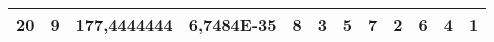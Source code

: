 \documentclass[conference]{IEEEtran}
\begin{document}
\begin{table*}[]
\begin{tabular}{|llll|llllllll|}
\multicolumn{1}{|l|}{20}                                                             & \multicolumn{1}{l|}{9}                                                                 & \multicolumn{1}{l|}{177,4444444}                                                           & 6,7484E-35                              & \multicolumn{1}{l|}{8}                                                           & \multicolumn{1}{l|}{3}                                                           & \multicolumn{1}{l|}{5}                                                           & \multicolumn{1}{l|}{7}                                                           & \multicolumn{1}{l|}{2}                                                           & \multicolumn{1}{l|}{6}                                                           & \multicolumn{1}{l|}{4}                                                           & \textbf{1}                          \\ \hline
\end{tabular}
\label{tab:tabla1.1}
\end{table*}
\end{document}
